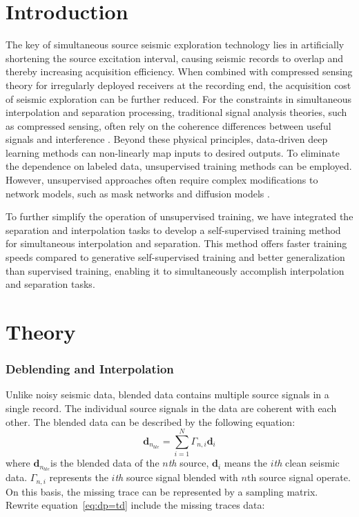 \documentclass{segabs}
\begin{document}
\section{Introduction}
The key of simultaneous source seismic exploration technology lies in artificially shortening the source excitation interval, causing seismic records to overlap and thereby increasing acquisition efficiency. When combined with compressed sensing theory for irregularly deployed receivers at the recording end, the acquisition cost of seismic exploration can be further reduced. 
For the constraints in simultaneous interpolation and separation processing, traditional signal analysis theories, such as compressed sensing, often rely on the coherence differences between useful signals and interference \cite[]{zhouSimultaneousDeblendingInterpolation2018}. Beyond these physical principles, data-driven deep learning methods can non-linearly map inputs to desired outputs. To eliminate the dependence on labeled data, unsupervised training methods can be employed. However, unsupervised approaches often require complex modifications to network models, such as mask networks \cite[]{wangSelfsupervisedSimultaneousDeblending2024} and diffusion models \cite[]{sen2019}. 

To further simplify the operation of unsupervised training, we have integrated the separation and interpolation tasks to develop a self-supervised training method for simultaneous interpolation and separation. This method offers faster training speeds compared to generative self-supervised training and better generalization than supervised training, enabling it to simultaneously accomplish interpolation and separation tasks. 
\section*{Theory}

\subsubsection{Deblending and Interpolation}

Unlike noisy seismic data, blended data contains multiple source signals in a single record. The individual source signals in the data are coherent with each other. The blended data can be described by the following equation:
\begin{equation}\label{eq:dp=td}
\mathbf{d}_{n_{ble}}=\sum_{i=1}^{N}\Gamma_{n,i}\mathbf{d}_i
\end{equation}
where $\mathbf{d}_{n_{ble}}$is the blended data of the $n$\textit{th} source, $\mathbf{d}_i$ means the $i$\textit{th} clean seismic data. $\Gamma_{n,i}$ represents the $i$\textit{th} source signal blended with $n$th source signal operate. On this basis, the missing trace can be represented by a sampling matrix. Rewrite equation~\ref{eq:dp=td} include the missing traces data:
\end{document}
